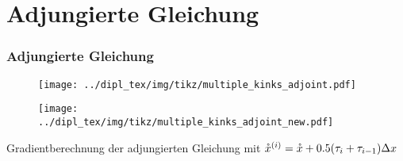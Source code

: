 \section[Problemstellung]{Adjungierte Gleichung}
\begin{frame}[<+->]
\frametitle{Adjungierte Gleichung}
\begin{figure}
\centering
\texttt{[image: ../dipl\_tex/img/tikz/multiple\_kinks\_adjoint.pdf]}

\end{figure}
\begin{figure}
\centering
\texttt{[image: ../dipl\_tex/img/tikz/multiple\_kinks\_adjoint\_new.pdf]}
\end{figure}
\centering
Gradientberechnung der adjungierten Gleichung mit $\mathring{x}^{(i)} = \mathring{x} + 0.5(\tau_i+\tau_{i-1})\Delta x$
\end{frame}
